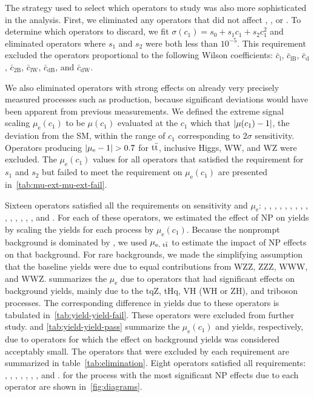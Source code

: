 The strategy used to select which operators to study was also more sophisticated
in the \thirteenTeV analysis. First, we eliminated any operators that did not
affect \ttW, \ttZ, or \ttH. To determine which operators to discard, we fit
$\sigma(c_1) = s_0 + s_1 c_1 + s_2c_1^2$ and eliminated operators where $s_1$
and $s_2$ were both less than $10^{-5}$. This requirement excluded the operators
proportional to the following Wilson coefficients: $\bar{c}_\text{l}$,
$\bar{c}_\text{lB}$, $\bar{c}_\text{d}$, $\bar{c}_\text{2B}$,
$\bar{c}_\text{lW}$, $\bar{c}_\text{dB}$, and $\bar{c}_\text{dW}$.

We also eliminated operators with strong effects on already very precisely
measured processes such as \ttbar production, because significant deviations
would have been apparent from previous measurements. We defined the extreme
signal scaling $\mu_\text{e}(c_1)$ to be $\mu(c_1)$ evaluated at the $c_1$ which
that $\lvert\mu(c_1) - 1\rvert$, the deviation from the SM, within the range of $c_1$
corresponding to $2\sigma$ sensitivity. Operators producing $\lvert\mu_\text{e} -
1\rvert > 0.7$ for $\text{t}\bar{\text{t}}$, inclusive Higgs, WW, and WZ were excluded. The
$\mu_\text{e}(c_1)$ values for all operators that satisfied the requirement for
$s_1$ and $s_2$ but failed to meet the requirement on $\mu_\text{e}(c_1)$ are
presented in~\cref{tab:mu-ext-mu-ext-fail}.

\begin{table}
  \centering
  
\end{table}

Sixteen operators satisfied all the requirements on sensitivity and
$\mu_\text{e}$: \cuW, \cH, \tcthreeG, \cthreeG, \cuG, \cHu, \ctwoG, \cuB, \cHB,
\tcHW, \cHud, \cHQ, \cB, \tcA, \cpHQ, and \cu. For each of these operators, we
estimated the effect of NP on yields by scaling the yields for each process by
$\mu_\text{e}(c_1)$. Because the nonprompt background is dominated by \ttbar, we
used $\mu_\text{e, \ensuremath{\text{t}\bar{\text{t}}}}$ to estimate the impact of NP effects on that
background. For rare backgrounds, we made the simplifying assumption that the
baseline yields were due to equal contributions from WZZ, ZZZ, WWW, and WWZ.
 summarizes the $\mu_\text{e}$ due to operators that
had significant effects on background yields, mainly due to the tqZ, tHq, VH (WH
or ZH), and triboson processes. The corresponding difference in yields due to
these operators is tabulated in~\cref{tab:yield-yield-fail}. These operators
were excluded from further study.  and
\cref{tab:yield-yield-pass} summarize the  $\mu_\text{e}(c_1)$ and yields,
respectively, due to operators for which the effect on background yields was
considered acceptably small. The operators that were excluded by each
requirement are summarized in table~\cref{tab:elimination}. Eight operators
satisfied all requirements: \cH, \tcthreeG, \cthreeG, \cuG, \cuB, \cHu, \cuW,
and \ctwoG. %
for the process with the most significant NP effects due to each operator are
shown in~\cref{fig:diagrams}.


